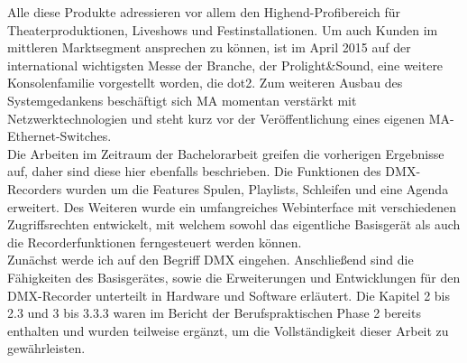 \documentclass[11pt]{scrartcl}
\begin{document}
Alle diese Produkte adressieren vor allem den Highend-Profibereich für Theaterproduktionen,
Liveshows und Festinstallationen. Um auch Kunden im mittleren Marktsegment ansprechen zu
können, ist im April 2015 auf der international wichtigsten Messe der Branche, der Prolight\&Sound,
eine weitere Konsolenfamilie vorgestellt worden, die dot2. Zum weiteren Ausbau des
Systemgedankens beschäftigt sich MA momentan verstärkt mit Netzwerktechnologien und steht kurz
vor der Veröffentlichung eines eigenen MA-Ethernet-Switches.\\
Die Arbeiten im Zeitraum der Bachelorarbeit greifen die vorherigen Ergebnisse auf, daher sind diese
hier ebenfalls beschrieben. Die Funktionen des DMX-Recorders wurden um die Features Spulen,
Playlists, Schleifen und eine Agenda erweitert. Des Weiteren wurde ein umfangreiches Webinterface
mit verschiedenen Zugriffsrechten entwickelt, mit welchem sowohl das eigentliche Basisgerät als
auch die Recorderfunktionen ferngesteuert werden können.\\
Zunächst werde ich auf den Begriff DMX eingehen. Anschließend sind die Fähigkeiten des
Basisgerätes, sowie die Erweiterungen und Entwicklungen für den DMX-Recorder unterteilt in
Hardware und Software erläutert. Die Kapitel 2 bis 2.3 und 3 bis 3.3.3 waren im Bericht der
Berufspraktischen Phase 2 bereits enthalten und wurden teilweise ergänzt, um die Vollständigkeit
dieser Arbeit zu gewährleisten.\\
\end{document}
